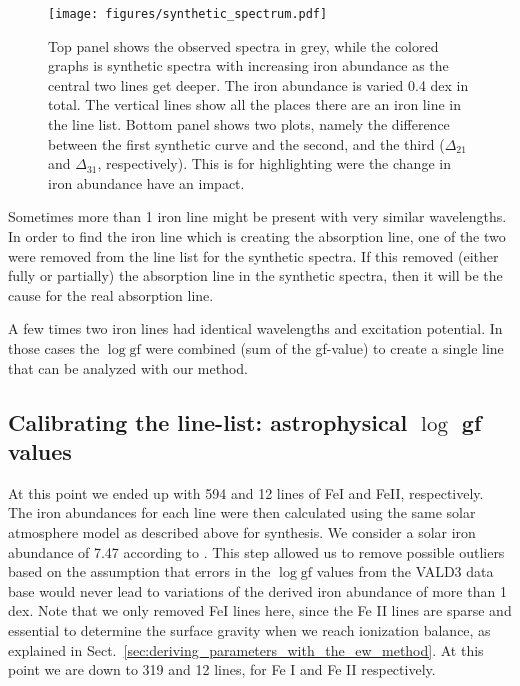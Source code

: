 \documentclass{aa}
\begin{document}
\begin{figure}[tpb]
    \centering
    \texttt{[image: figures/synthetic\_spectrum.pdf]}
    \caption{Top panel shows the observed spectra in grey, while
        the colored graphs is synthetic spectra with increasing iron
        abundance as the central two lines get deeper. The iron abundance
        is varied 0.4 dex in total. The vertical lines show all the places
        there are an iron line in the line list. Bottom panel shows
        two plots, namely the difference between the first synthetic curve
        and the second, and the third ($\Delta_{21}$ and $\Delta_{31}$,
        respectively). This is for highlighting were the change in iron
        abundance have an impact.}
    \label{fig:synthesis}
\end{figure}


Sometimes more than 1 iron line might be present with very similar
wavelengths. In order to find the iron line which is creating the
absorption line, one of the two were removed from the line list for
the synthetic spectra. If this removed (either fully or partially) the
absorption line in the synthetic spectra, then it will be the cause for
the real absorption line.

A few times two iron lines had identical wavelengths and excitation
potential. In those cases the $\log \mathrm{gf}$ were combined (sum of
the gf-value) to create a single line that can be analyzed with our
method.


\subsection{Calibrating the line-list: astrophysical $\log$ gf values}
\label{ssub:Recalibrating-the-atomic-data}

At this point we ended up with 594 and 12 lines of FeI and FeII,
respectively. The iron abundances for each line were then calculated
using the same solar atmosphere model as described above for
synthesis. We consider a solar iron abundance of 7.47 according to
\cite{Gonzalez2000}. This step allowed us to remove possible outliers
based on the assumption that errors in the $\log \mathrm{gf}$ values
from the VALD3 data base would never lead to variations of the derived
iron abundance of more than 1 dex. Note that we only removed FeI lines
here, since the Fe II lines are sparse and essential to determine the
surface gravity when we reach ionization balance, as explained in
Sect.~\ref{sec:deriving_parameters_with_the_ew_method}. At this point we
are down to 319 and 12 lines, for Fe I and Fe II respectively.
\end{document}
